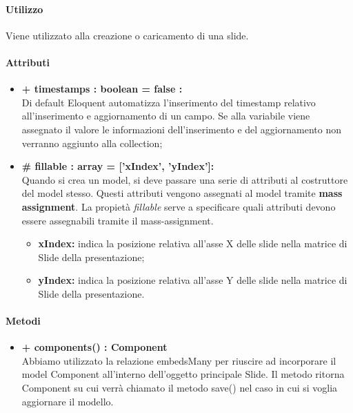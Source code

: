 	\paragraph{Utilizzo}
	Viene utilizzato alla creazione o caricamento di una slide.

	\paragraph{Attributi}
	\begin{itemize}
		\item \textbf{+ timestamps : boolean = false :}\\
		Di default Eloquent automatizza l'inserimento del timestamp relativo all'inserimento e aggiornamento di un campo. Se alla variabile viene assegnato il valore le informazioni dell'inserimento e del aggiornamento non verranno aggiunto alla collection;
		\item \textbf{\# fillable : array = [’xIndex’, ’yIndex']:}\\
		Quando si crea un model, si deve passare una serie di attributi al costruttore del model stesso. Questi attributi vengono assegnati al model tramite \textbf{mass assignment}. La propietà \textit{fillable} serve a specificare quali attributi devono essere assegnabili tramite il mass-assignment.
		\begin{itemize}
			\item \textbf{xIndex:} indica la posizione relativa all'asse X delle slide nella matrice di Slide della presentazione;
			\item \textbf{yIndex:} indica la posizione relativa all'asse Y delle slide nella matrice di Slide della presentazione.
		\end{itemize}
	\end{itemize}
	
	\paragraph{Metodi}
	\begin{itemize}
		\item \textbf{+ components() : Component}\\
		Abbiamo utilizzato la relazione embedsMany per riuscire ad incorporare il model Component all’interno dell’oggetto principale Slide. Il metodo ritorna Component su cui verrà chiamato il metodo save() nel caso in cui si voglia aggiornare il modello.
	\end{itemize}
	\newpage
	

